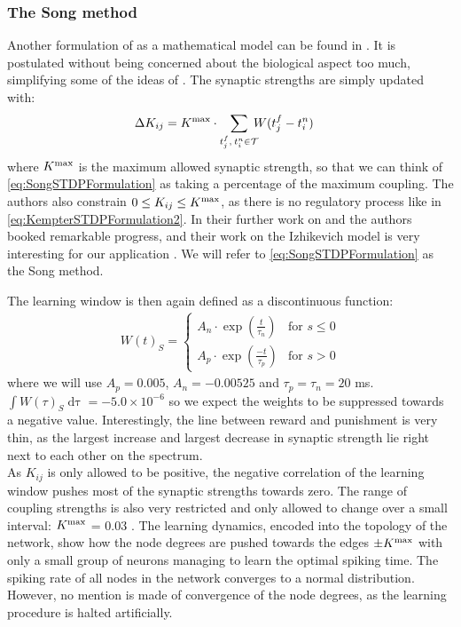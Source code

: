 \subsubsection{The Song method}
Another formulation of \STDP as a mathematical model can be found in \cite{Song2000}. It is postulated without being concerned about the biological aspect too much, simplifying some of the ideas of \cite{Kempter1999}. The synaptic strengths are simply updated with:
\begin{align}
\Delta K_{ij} &= K^{\rm max} \cdot \sum_{t_{j}^{f}, \: t_i^{n} \in \mathcal{T}} \hspace{-2mm} W (t_{j}^{f}-t_i^{n} ) \label{eq:SongSTDPFormulation}
\end{align}
where $K^{\rm max}$ is the maximum allowed synaptic strength, so that we can think of \eqref{eq:SongSTDPFormulation} as taking a percentage of the maximum coupling. The authors also constrain $0 \leq K_{ij} \leq K^{\rm max}$, as there is no regulatory process like in \eqref{eq:KempterSTDPFormulation2}. In their further work on \STDP and \IP the authors booked remarkable progress, and their work on the Izhikevich model is very interesting for our application \cite{Song2017}. We will refer to \eqref{eq:SongSTDPFormulation} as the Song method. 

The learning window is then again defined as a discontinuous function:
\begin{align}
W(t)_S =
\begin{cases}
A_{n} \cdot \exp \left(\frac{t}{\tau_n}\right)  & \text{for } s \leq 0 \\
A_{p} \cdot \exp \left(\frac{-t}{\tau_p}\right) & \text{for } s > 0 
\end{cases} \label{eq:learningwindowSong2000}
\end{align}
where we will use $A_p = 0.005$, $A_n = -0.00525$ and $\tau_p = \tau_n = 20$ ms. $\int W(\tau)_S \mathop{d \tau} = -5.0 \times 10^{-6}$ so we expect the weights to be suppressed towards a negative value. Interestingly, the line between reward and punishment is very thin, as the largest increase and largest decrease in synaptic strength lie right next to each other on the spectrum. \\

As $K_{ij}$ is only allowed to be positive, the negative correlation of the learning window pushes most of the synaptic strengths towards zero. The range of coupling strengths is also very restricted and only allowed to change over a small interval: $K^{\rm max}$ = 0.03 \cite{Song2000, Song2017, ChrolCannon2012}. The learning dynamics, encoded into the topology of the network, show how the node degrees are pushed towards the edges $\pm K^{\rm max}$ with only a small group of neurons managing to learn the optimal spiking time. The spiking rate of all nodes in the network converges to a normal distribution. However, no mention is made of convergence of the node degrees, as the learning procedure is halted artificially.\\

